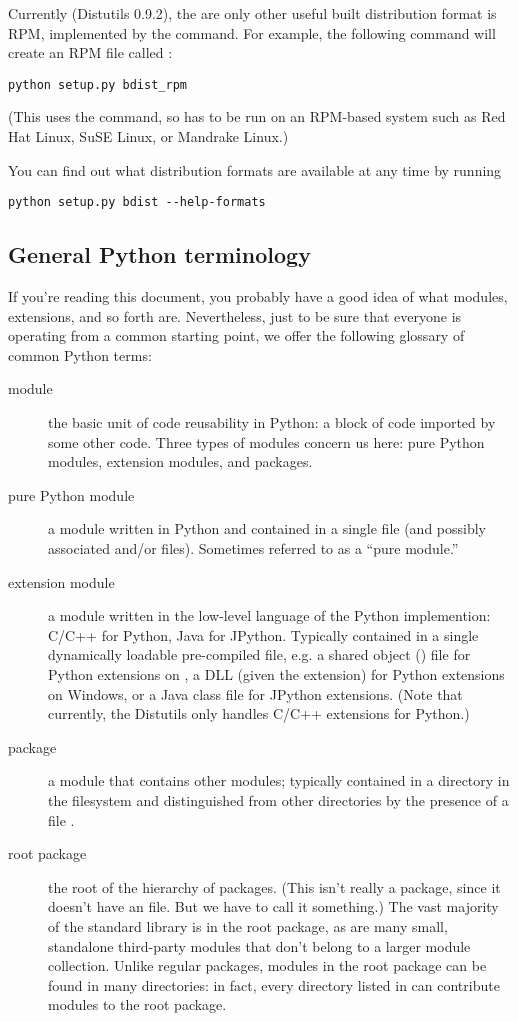\documentclass{howto}
\begin{document}
Currently (Distutils 0.9.2), the are only other useful built
distribution format is RPM, implemented by the 
command.  For example, the following command will create an RPM file
called :
\begin{verbatim}
python setup.py bdist_rpm
\end{verbatim}
(This uses the  command, so has to be run on an RPM-based
system such as Red Hat Linux, SuSE Linux, or Mandrake Linux.)

You can find out what distribution formats are available at any time by
running
\begin{verbatim}
python setup.py bdist --help-formats
\end{verbatim}


\subsection{General Python terminology}
\label{python-terms}

If you're reading this document, you probably have a good idea of what
modules, extensions, and so forth are.  Nevertheless, just to be sure
that everyone is operating from a common starting point, we offer the
following glossary of common Python terms:
\begin{description}
\item[module] the basic unit of code reusability in Python: a block of
  code imported by some other code.  Three types of modules concern us
  here: pure Python modules, extension modules, and packages.
\item[pure Python module] a module written in Python and contained in a
  single  file (and possibly associated  and/or
   files).  Sometimes referred to as a ``pure module.''
\item[extension module] a module written in the low-level language of
  the Python implemention: C/C++ for Python, Java for JPython.
  Typically contained in a single dynamically loadable pre-compiled
  file, e.g. a shared object () file for Python extensions on
  \UNIX, a DLL (given the  extension) for Python extensions
  on Windows, or a Java class file for JPython extensions.  (Note that
  currently, the Distutils only handles C/C++ extensions for Python.)
\item[package] a module that contains other modules; typically contained
  in a directory in the filesystem and distinguished from other
  directories by the presence of a file .
\item[root package] the root of the hierarchy of packages.  (This isn't
  really a package, since it doesn't have an 
  file.  But we have to call it something.)  The vast majority of the
  standard library is in the root package, as are many small, standalone
  third-party modules that don't belong to a larger module collection.
  Unlike regular packages, modules in the root package can be found in
  many directories: in fact, every directory listed in 
  can contribute modules to the root package.
\end{description}
\end{document}
